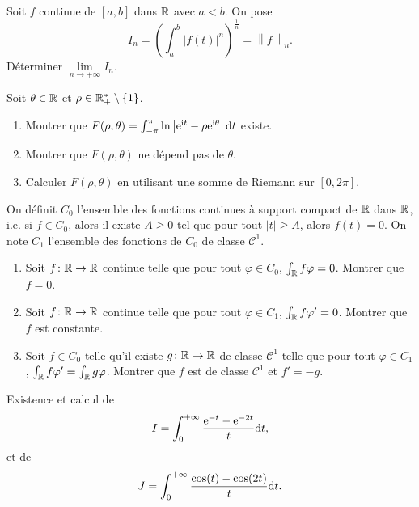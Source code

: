 \begin{exercise}
    Soit $f$ continue de $[a,b]$ dans $\mathbb{R}$ avec $a<b$. On pose 
    \begin{equation}
        I_n=\left(\int_{a}^{b}\left\lvert f(t)\right\rvert^{n}\right)^{\frac{1}{n}}=\left\lVert f\right\rVert_{n}.
    \end{equation}
    Déterminer $\lim\limits_{n\to+\infty}I_n$.
\end{exercise}

\begin{exercise}
    Soit $\theta\in\mathbb{R}$ et $\rho\in\mathbb{R}_{+}^{*}\setminus\left\lbrace1\right\rbrace$.
    \begin{enumerate}
        \item Montrer que $F(\rho,\theta)=\int_{-\pi}^{\pi}\ln\left\lvert\mathrm{e}^{\mathrm{i} t}-\rho\mathrm{e}^{\mathrm{i}\theta}\right\rvert\mathrm{d} t$ existe.
        \item Montrer que $F(\rho,\theta)$ ne dépend pas de $\theta$.
        \item Calculer $F(\rho,\theta)$ en utilisant une somme de Riemann sur $[0,2\pi]$.
    \end{enumerate}
\end{exercise}

\begin{exercise}
    On définit $C_{0}$ l'ensemble des fonctions continues à support compact de $\mathbb{R}$ dans $\mathbb{R}$, i.e. si $f\in C_{0}$, alors il existe $A\geqslant0$ tel que pour tout $\left\lvert t\right\rvert\geqslant A$, alors $f(t)=0$. On note $C_{1}$ l'ensemble des fonctions de $C_{0}$ de classe $\mathcal{C}^{1}$.
    \begin{enumerate}
        \item Soit $f\colon\mathbb{R}\to\mathbb{R}$ continue telle que pour tout $\varphi\in C_{0}$, $\int_{\mathbb{R}}f\varphi=0$. Montrer que $f=0$.
        \item Soit $f\colon\mathbb{R}\to\mathbb{R}$ continue telle que pour tout $\varphi\in C_{1}$, $\int_{\mathbb{R}}f\varphi'=0$. Montrer que $f$ est constante.
        \item Soit $f\in C_{0}$ telle qu'il existe $g\colon\mathbb{R}\to\mathbb{R}$ de classe $\mathcal{C}^{1}$ telle que pour tout $\varphi\in C_{1}$, $\int_{\mathbb{R}}f\varphi'=\int_{\mathbb{R}}g\varphi$. Montrer que $f$ est de classe $\mathcal{C}^{1}$ et $f'=-g$.
    \end{enumerate}
\end{exercise}

\begin{exercise}
    Existence et calcul de 
    \begin{equation}
        I=\int_{0}^{+\infty}\frac{\mathrm{e}^{-t}-\mathrm{e}^{-2t}}{t}\mathrm{d} t,
    \end{equation}
    et de 
    \begin{equation}
        J=\int_{0}^{+\infty}\frac{\cos(t)-\cos(2t)}{t}\mathrm{d} t.
    \end{equation}
\end{exercise}

